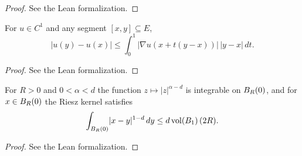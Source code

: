 \begin{proof}
\leanok
{}
See the Lean formalization.
\end{proof}

\begin{lemma}
\label{lem:norm_sub_le_integral_fderiv_along_segment}
\leanok
For $u \in C^{1}$ and any segment $[x,y] \subseteq E$,
\begin{equation*}
\lvert u(y) - u(x)\rvert
\le \int_{0}^{1} \lvert \nabla u(x + t(y-x))\rvert\, \lvert y-x\rvert\, dt.
\end{equation*}
\end{lemma}

\begin{proof}
\leanok
See the Lean formalization.
\end{proof}

\begin{lemma}
\label{lem:integral_norm_rpow_neg_ball}
\leanok
For $R > 0$ and $0 < \alpha < d$ the function $z\mapsto \lvert z\rvert^{\alpha-d}$ is
integrable on $B_{R}(0)$, and for $x \in B_{R}(0)$ the Riesz kernel satisfies
\begin{equation*}
\int_{B_{R}(0)} \lvert x - y\rvert^{1-d}\, dy
\le d\, \mathrm{vol}(B_{1})\, (2R).
\end{equation*}
\end{lemma}

\begin{proof}
\leanok
{}
See the Lean formalization.
\end{proof}


